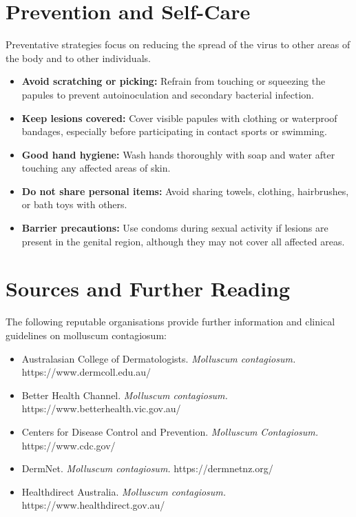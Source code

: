 \section*{Prevention and Self-Care}
Preventative strategies focus on reducing the spread of the virus to other areas of the body and to other individuals.
\begin{itemize}
    \item \textbf{Avoid scratching or picking:} Refrain from touching or squeezing the papules to prevent autoinoculation and secondary bacterial infection.
    \item \textbf{Keep lesions covered:} Cover visible papules with clothing or waterproof bandages, especially before participating in contact sports or swimming.
    \item \textbf{Good hand hygiene:} Wash hands thoroughly with soap and water after touching any affected areas of skin.
    \item \textbf{Do not share personal items:} Avoid sharing towels, clothing, hairbrushes, or bath toys with others.
    \item \textbf{Barrier precautions:} Use condoms during sexual activity if lesions are present in the genital region, although they may not cover all affected areas.
\end{itemize}

\section*{Sources and Further Reading}
The following reputable organisations provide further information and clinical guidelines on molluscum contagiosum:
\begin{itemize}
    \item Australasian College of Dermatologists. \textit{Molluscum contagiosum.} https://www.dermcoll.edu.au/
    \item Better Health Channel. \textit{Molluscum contagiosum.} https://www.betterhealth.vic.gov.au/
    \item Centers for Disease Control and Prevention. \textit{Molluscum Contagiosum.} https://www.cdc.gov/
    \item DermNet. \textit{Molluscum contagiosum.} https://dermnetnz.org/
    \item Healthdirect Australia. \textit{Molluscum contagiosum.} https://www.healthdirect.gov.au/
\end{itemize}
